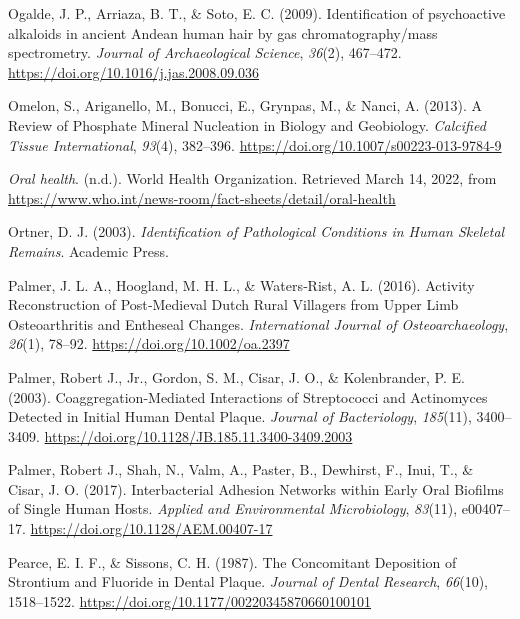 \documentclass[
  letterpaper,
]{book}
\newlength{\cslhangindent}
\newlength{\cslentryspacingunit} %
\newenvironment{CSLReferences}[2] %
 {%
  \setlength{\parindent}{0pt}
  \ifodd #1
  \let\oldpar\par
  \def\par{\hangindent=\cslhangindent\oldpar}
  \fi
  \setlength{\parskip}{#2\cslentryspacingunit}
 }%
 {}
\begin{document}
\begin{CSLReferences}{1}{0}
\leavevmode{}%
Ogalde, J. P., Arriaza, B. T., \& Soto, E. C. (2009). Identification of
psychoactive alkaloids in ancient {Andean} human hair by gas
chromatography/mass spectrometry. \emph{Journal of Archaeological
Science}, \emph{36}(2), 467--472.
\url{https://doi.org/10.1016/j.jas.2008.09.036}

\leavevmode{}%
Omelon, S., Ariganello, M., Bonucci, E., Grynpas, M., \& Nanci, A.
(2013). A {Review} of {Phosphate Mineral Nucleation} in {Biology} and
{Geobiology}. \emph{Calcified Tissue International}, \emph{93}(4),
382--396. \url{https://doi.org/10.1007/s00223-013-9784-9}

\leavevmode{}%
\emph{Oral health}. (n.d.). {World Health Organization}. Retrieved March
14, 2022, from
\url{https://www.who.int/news-room/fact-sheets/detail/oral-health}

\leavevmode{}%
Ortner, D. J. (2003). \emph{Identification of {Pathological Conditions}
in {Human Skeletal Remains}}. {Academic Press}.

\leavevmode{}%
Palmer, J. L. A., Hoogland, M. H. L., \& Waters‐Rist, A. L. (2016).
Activity {Reconstruction} of {Post}‐{Medieval Dutch Rural Villagers}
from {Upper Limb Osteoarthritis} and {Entheseal Changes}.
\emph{International Journal of Osteoarchaeology}, \emph{26}(1), 78--92.
\url{https://doi.org/10.1002/oa.2397}

\leavevmode{}%
Palmer, Robert J., Jr., Gordon, S. M., Cisar, J. O., \& Kolenbrander, P.
E. (2003). Coaggregation-{Mediated Interactions} of {Streptococci} and
{Actinomyces Detected} in {Initial Human Dental Plaque}. \emph{Journal
of Bacteriology}, \emph{185}(11), 3400--3409.
\url{https://doi.org/10.1128/JB.185.11.3400-3409.2003}

\leavevmode{}%
Palmer, Robert J., Shah, N., Valm, A., Paster, B., Dewhirst, F., Inui,
T., \& Cisar, J. O. (2017). Interbacterial {Adhesion Networks} within
{Early Oral Biofilms} of {Single Human Hosts}. \emph{Applied and
Environmental Microbiology}, \emph{83}(11), e00407--17.
\url{https://doi.org/10.1128/AEM.00407-17}

\leavevmode{}%
Pearce, E. I. F., \& Sissons, C. H. (1987). The {Concomitant Deposition}
of {Strontium} and {Fluoride} in {Dental Plaque}. \emph{Journal of
Dental Research}, \emph{66}(10), 1518--1522.
\url{https://doi.org/10.1177/00220345870660100101}


\end{CSLReferences}
\end{document}

